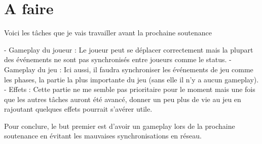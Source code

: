 \documentclass{article}
\begin{document}
\section{A faire}

Voici les tâches que je vais travailler avant la prochaine soutenance


- Gameplay du joueur : Le joueur peut se déplacer correctement mais la plupart des événements ne sont pas synchronisés entre joueurs comme le status.
- Gameplay du jeu : Ici aussi, il faudra synchroniser les événements de jeu comme les phases, la partie la plus importante du jeu (sans elle il n'y a aucun gameplay).
- Effets : Cette partie ne me semble pas prioritaire pour le moment mais une fois que les autres tâches auront été avancé, donner un peu plus de vie au jeu en rajoutant quelques effets pourrait s'avérer utile.

Pour conclure, le but premier est d'avoir un gameplay lors de la prochaine soutenance en évitant les mauvaises synchronisations en réseau.


 

\newpage
\end{document}
